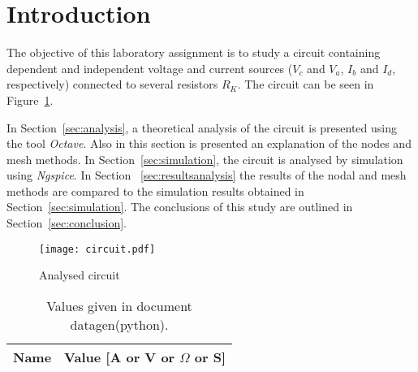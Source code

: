 \section{Introduction}
\label{sec:introduction}

The objective of this laboratory assignment is to study a circuit containing
dependent and independent voltage and current sources ($V_c$ and $V_a$, $I_b$ and $I_d$, respectively) connected to several resistors $R_K$.
The circuit can be seen in Figure~\ref{fig:circuit}.

In Section~\ref{sec:analysis}, a theoretical analysis of the circuit is
presented using the tool \textit{Octave}. Also in this section is presented an explanation of the nodes and mesh methods. In Section~\ref{sec:simulation}, the circuit is analysed by
simulation using \textit{Ngspice}. In Section ~\ref{sec:resultsanalysis} the results of the nodal and mesh methods are compared to the simulation results obtained in
Section~\ref{sec:simulation}. The conclusions of this study are outlined in
Section~\ref{sec:conclusion}.

\begin{figure}[ht] \centering
\texttt{[image: circuit.pdf]}
\caption{Analysed circuit}
\label{fig:circuit}
\end{figure}

\begin{table}[ht]
  \centering
  \begin{tabular}{|l|r|}
    \hline    
    {\bf Name} & {\bf Value [A or V or $\Omega$ or S]} \\ \hline
    
  \end{tabular}
  \caption{Values given in document datagen(python).}
  \label{tab:Res}
\end{table}
